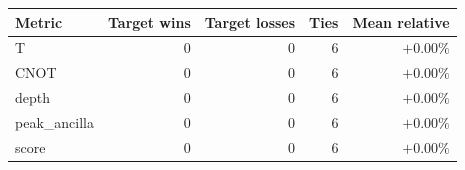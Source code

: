 \begin{tabular}{lrrrr}
\toprule
Metric & Target wins & Target losses & Ties & Mean relative \\
\midrule
T & 0 & 0 & 6 & $+0.00\%$ \\
CNOT & 0 & 0 & 6 & $+0.00\%$ \\
depth & 0 & 0 & 6 & $+0.00\%$ \\
peak_ancilla & 0 & 0 & 6 & $+0.00\%$ \\
score & 0 & 0 & 6 & $+0.00\%$ \\
\bottomrule
\end{tabular}
